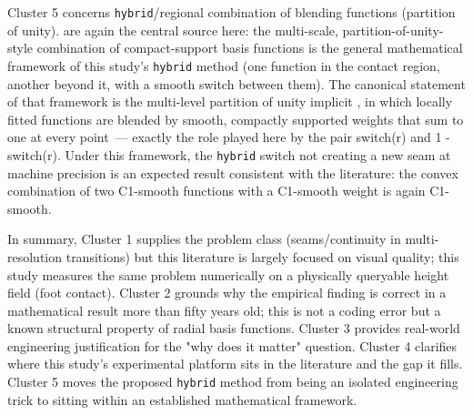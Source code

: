 Cluster 5 concerns \texttt{hybrid}/regional combination of blending functions (partition of unity). \citet{ohtake2003} are again the central source here: the multi-scale, partition-of-unity-style combination of compact-support basis functions is the general mathematical framework of this study's \texttt{hybrid} method (one function in the contact region, another beyond it, with a smooth switch between them). The canonical statement of that framework is the multi-level partition of unity implicit \citep{ohtake2003mpu}, in which locally fitted functions are blended by smooth, compactly supported weights that sum to one at every point~--- exactly the role played here by the pair switch(r) and 1 - switch(r). Under this framework, the \texttt{hybrid} switch not creating a new seam at machine precision is an expected result consistent with the literature: the convex combination of two C1-smooth functions with a C1-smooth weight is again C1-smooth.

In summary, Cluster 1 supplies the problem class (seams/continuity in multi-resolution transitions) but this literature is largely focused on visual quality; this study measures the same problem numerically on a physically queryable height field (foot contact). Cluster 2 grounds why the empirical finding is correct in a mathematical result more than fifty years old; this is not a coding error but a known structural property of radial basis functions. Cluster 3 provides real-world engineering justification for the "why does it matter" question. Cluster 4 clarifies where this study's experimental platform sits in the literature and the gap it fills. Cluster 5 moves the proposed \texttt{hybrid} method from being an isolated engineering trick to sitting within an established mathematical framework.
